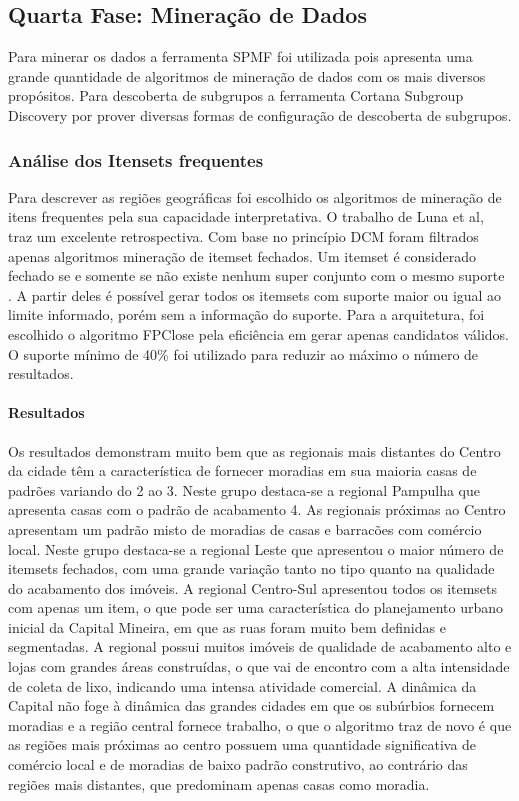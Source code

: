 \documentclass[12pt]{article}
\begin{document}
 \subsection{Quarta Fase: Mineração de Dados}
 Para minerar os dados a ferramenta SPMF \cite{SPMF} foi utilizada pois apresenta uma grande quantidade de algoritmos de mineração de dados com os mais diversos propósitos. Para descoberta de subgrupos a ferramenta Cortana Subgroup Discovery \cite{meeng2011flexible} por prover diversas formas de configuração de descoberta de subgrupos.
 \subsubsection{Análise dos Itensets frequentes}
 Para descrever as regiões geográficas foi escolhido os algoritmos de mineração de itens frequentes pela sua capacidade interpretativa. O trabalho de Luna et al\cite{luna2019frequent}, traz um excelente retrospectiva. Com base no princípio DCM foram filtrados apenas algoritmos mineração de itemset fechados. Um itemset é considerado fechado se e somente se não existe nenhum super conjunto com o mesmo suporte \cite{lucchese2004mining}. A partir deles é possível gerar todos os itemsets com suporte maior ou igual ao limite informado, porém sem a informação do suporte. Para a arquitetura, foi escolhido o algoritmo FPClose \cite{grahne2005fast} pela eficiência em gerar apenas candidatos válidos. O suporte mínimo de 40\% foi utilizado para reduzir ao máximo o número de resultados.
 
\paragraph{Resultados}
Os resultados demonstram muito bem que as regionais mais distantes do Centro da cidade têm a característica de fornecer moradias em sua maioria casas de padrões variando do 2 ao 3. Neste grupo destaca-se a regional Pampulha que apresenta casas com o padrão de acabamento 4. As regionais próximas ao Centro apresentam um padrão misto de moradias de casas e barracões com comércio local. Neste grupo destaca-se a regional Leste que apresentou o maior número de itemsets fechados, com uma grande variação tanto no tipo quanto na qualidade do acabamento dos imóveis. A regional Centro-Sul apresentou todos os itemsets com apenas um item, o que pode ser uma característica do planejamento urbano inicial da Capital Mineira, em que as ruas foram muito bem definidas e segmentadas. A regional possui muitos imóveis de qualidade de acabamento alto e lojas com grandes áreas construídas, o que vai de encontro com a alta intensidade de coleta de lixo, indicando uma intensa atividade comercial. A dinâmica da Capital não foge à dinâmica das grandes cidades em que os subúrbios fornecem moradias e a região central fornece trabalho, o que o algoritmo traz de novo é que as regiões mais próximas ao centro possuem uma quantidade significativa de comércio local e de moradias de baixo padrão construtivo, ao contrário das regiões mais distantes, que predominam apenas casas como moradia. 
\end{document}
